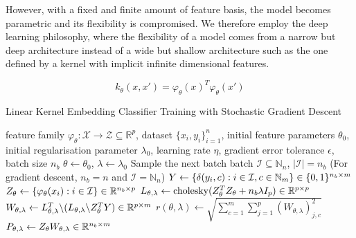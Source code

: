 \documentclass{article}
\begin{document}
		However, with a fixed and finite amount of feature basis, the model becomes parametric and its flexibility is compromised. We therefore employ the deep learning philosophy, where the flexibility of a model comes from a narrow but deep architecture instead of a wide but shallow architecture such as the one defined by a kernel with implicit infinite dimensional features. 
		
		
		
		
		\begin{equation}
		k_{\theta}(x, x') = \varphi_{\theta}(x)^{T} \varphi_{\theta}(x')
		\end{equation}
		
		\begin{algorithm}[tb]
			\caption{Linear Kernel Embedding Classifier Training with Stochastic Gradient Descent}
			\label{alg:linear_kernel_embedding_classifier_training}
			\begin{algorithmic}[1]
				 feature family $\varphi_{\theta} : \mathcal{X} \to \mathcal{Z} \subseteq \mathbb{R}^{p}$, dataset $\{x_{i}, y_{i}\}_{i = 1}^{n}$, initial feature parameters $\theta_{0}$, initial regularisation parameter $\lambda_{0}$, learning rate $\eta$, gradient error tolerance $\epsilon$, batch size $n_{b}$
				\STATE $\theta \leftarrow \theta_{0}$, $\lambda \leftarrow \lambda_{0}$
				\REPEAT
				\STATE Sample the next batch batch $\mathcal{I} \subseteq \mathbb{N}_{n}$, $| \mathcal{I} | = n_{b}$ \hspace{\fill} (For gradient descent, $n_{b} = n$ and $\mathcal{I} = \mathbb{N}_{n}$)
				\STATE $Y \leftarrow \{\delta(y_{i}, c) : i \in \mathcal{I}, c \in \mathbb{N}_{m}\} \hspace{\fill} \in \{0, 1\}^{n_{b} \times m}$
				\STATE $Z_{\theta} \leftarrow \{\varphi_{\theta}(x_{i}) : i \in \mathcal{I}\} \hspace{\fill} \in \mathbb{R}^{n_{b} \times p}$
				\STATE $L_{\theta, \lambda} \leftarrow \mathrm{cholesky}(Z_{\theta}^{T} Z_{\theta} + n_{b} \lambda I_{p}) \hspace{\fill} \in \mathbb{R}^{p \times p}$
				\STATE $W_{\theta, \lambda} \leftarrow L_{\theta, \lambda}^{T} \backslash (L_{\theta, \lambda} \backslash Z_{\theta}^{T} Y) \hspace{\fill} \in \mathbb{R}^{p \times m}$
				\STATE $r(\theta, \lambda) \leftarrow \sqrt{\sum_{c = 1}^{m} \sum_{j = 1}^{p} (W_{\theta, \lambda})_{j, c}^{2}}$
				\STATE $P_{\theta, \lambda} \leftarrow Z_{\theta} W_{\theta, \lambda} \hspace{\fill} \in \mathbb{R}^{n_{b} \times m}$

\end{algorithmic}
\end{algorithm}
\end{document}

